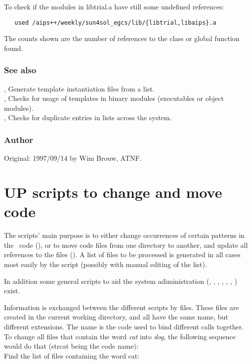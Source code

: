 To check if the modules in libtrial.a have still some undefined references:

\begin{verbatim}
   used /aips++/weekly/sun4sol_egcs/lib/{libtrial,libaips}.a
\end{verbatim}

The counts shown are the number of references to the class or global function
found.

\subsubsection*{See also}

, Generate template instantiation files from a list.\\
, Checks for usage of templates in binary modules (executables
or object modules).\\
, Checks for duplicate entries in  lists
   across the system.

\subsubsection*{Author}

Original: 1997/09/14 by Wim Brouw, ATNF.


\newpage
\section{UP scripts to change and move code}
\label{UPscripts}

The  scripts' main purpose is to either change occurrences of
certain patterns in the \aipspp\ code (), or to move code
files from one directory to another, and update all references to the files
(). A list of files to be processed is generated in all cases
most easily by the  script (possibly with manual editing of
the list). 

\noindent
In addition some general scripts to aid the system adiministration
(, , ,  
, , , ) exist.

\noindent
Information is exchanged between the different scripts by files. These files
are created in the current working directory, and all have the same name, but
different extensions. The name is the code used to bind different calls
together. To change all files that contain the word {\em cat} into {\em dog},
the following sequence would do that (strcat being the code name): \\
Find the list of files containing the word cat:

